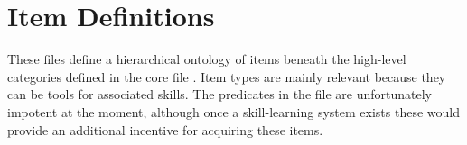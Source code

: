 \section{Item Definitions}

These files define a hierarchical ontology of items beneath the high-level categories defined in the core file .
%
Item types are mainly relevant because they can be tools for associated skills.
%
The  predicates in the  file are unfortunately impotent at the moment, although once a skill-learning system exists these would provide an additional incentive for acquiring these items. 



\pagestyle{default}

